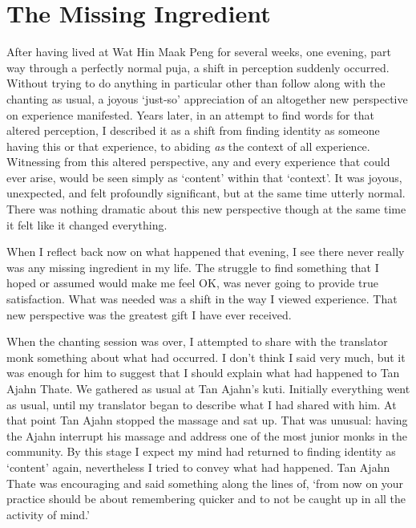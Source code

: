 \chapter{The Missing Ingredient}

After having lived at Wat Hin Maak Peng for several weeks, one evening,
part way through a perfectly normal puja, a shift in perception suddenly
occurred. Without trying to do anything in particular other than follow
along with the chanting as usual, a joyous `just-so' appreciation of an
altogether new perspective on experience manifested. Years later, in an
attempt to find words for that altered perception, I described it as a
shift from finding identity as someone having this or that experience,
to abiding \emph{as} the context of all experience. Witnessing from this
altered perspective, any and every experience that could ever arise,
would be seen simply as `content' within that `context'. It was joyous,
unexpected, and felt profoundly significant, but at the same time
utterly normal. There was nothing dramatic about this new perspective
though at the same time it felt like it changed everything.

When I reflect back now on what happened that evening, I see there never
really was any missing ingredient in my life. The struggle to find
something that I hoped or assumed would make me feel OK, was never going
to provide true satisfaction. What was needed was a shift in the way I
viewed experience. That new perspective was the greatest gift I have
ever received.

When the chanting session was over, I attempted to share with the
translator monk something about what had occurred. I don't think I said
very much, but it was enough for him to suggest that I should explain
what had happened to Tan Ajahn Thate. We gathered as usual at Tan
Ajahn's kuti. Initially everything went as usual, until my translator
began to describe what I had shared with him. At that point Tan Ajahn
stopped the massage and sat up. That was unusual: having the Ajahn
interrupt his massage and address one of the most junior monks in the
community. By this stage I expect my mind had returned to finding
identity as `content' again, nevertheless I tried to convey what had
happened. Tan Ajahn Thate was encouraging and said something along the
lines of, `from now on your practice should be about remembering quicker
and to not be caught up in all the activity of mind.'

